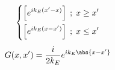 \documentclass{article}
\begin{document}
{\begin{enumerate}
\begin{equation*}
\begin{split}
\begin{dcases}
					\left[ e^{ik_E(x' - x)} \right] \; ; \; x \geq x' \\
					\left[ e^{ik_E(x - x')} \right] \; ; \; x \leq x'
				\end{dcases}
			\end{split}
		\end{equation*}
		\begin{equation*}
			\begin{split}
				G(x,x') = \frac{i}{2k_E} e^{ik_E\abs{x - x'}}
			\end{split}
		\end{equation*}

\end{enumerate}}
\end{document}
